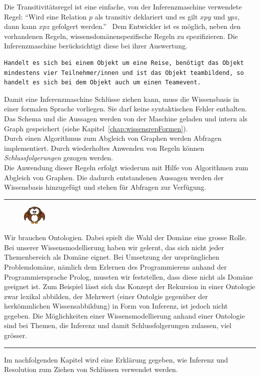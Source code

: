 Die Transitivitätsregel ist eine einfache, von der Inferenzmaschine verwendete Regel: ``Wird eine Relation $p$ als transitiv deklariert und es gilt $x p y$ und $y p z$, dann kann $x p z$ gefolgert werden.''~\cite[Seite 289]{IspekOntoBedeutung}
Dem Entwickler ist es möglich, neben den vorhandenen Regeln, wissensdomänenspezifische Regeln zu spezifizieren. Die Inferenzmaschine berücksichtigt diese bei ihrer Auswertung.

\begin{lstlisting}[caption={Beispiel einer Regel in einer Wissensbasis.}]
Handelt es sich bei einem Objekt um eine Reise, benötigt das Objekt mindestens vier Teilnehmer/innen und ist das Objekt teambildend, so handelt es sich bei dem Objekt auch um einen Teamevent.
\end{lstlisting}

Damit eine Inferenzmaschine Schlüsse ziehen kann, muss die Wissensbasis in einer formalen Sprache vorliegen. Sie darf keine syntaktischen Fehler enthalten. Das Schema und die Aussagen werden von der Maschine geladen und intern als Graph gespeichert (siehe Kapitel~\ref{chap:wissensrepFormen}).\\
Durch einen Algorithmus zum Abgleich von Graphen werden Abfragen implementiert. Durch wiederholtes Anwenden von Regeln können \textit{Schlussfolgerungen} gezogen werden.\\ Die Anwendung dieser Regeln erfolgt wiederum mit Hilfe von Algorithmen zum Abgleich von Graphen. Die dadurch entstandenen Aussagen werden der Wissensbasis hinzugefügt und stehen für Abfragen zur Verfügung.

\noindent\rule[1ex]{\textwidth}{1pt}
\begin{figure}
    \vspace{-14pt}
    \includegraphics[width=0.1\textwidth]{bilder/owl.png}
\end{figure}
Wir brauchen Ontologien. Dabei spielt die Wahl der Domäne eine grosse Rolle. Bei unserer Wissensmodellierung haben wir gelernt, das sich nicht jeder Themenbereich als Domäne eignet.
Bei Umsetzung der ursprünglichen Problemdomäne, nämlich dem Erlernen des Programmierens anhand der Programmiersprache Prolog, mussten wir feststellen, dass diese nicht als Domäne geeignet ist. Zum Beispiel lässt sich das Konzept der Rekursion in einer Ontologie zwar lexikal abbilden, der Mehrwert (einer Ontolgie gegenüber der herkömmlichen Wissensabbildung) in Form von Inferenz, ist jedoch nicht gegeben. Die Möglichkeiten einer Wissensmodellierung anhand einer Ontologie sind bei Themen, die Inferenz und damit Schlussfolgerungen zulassen, viel grösser.
\noindent\rule[1ex]{\textwidth}{1pt}

Im nachfolgenden Kapitel wird eine Erklärung gegeben, wie Inferenz und Resolution zum Ziehen von Schlüssen verwendet werden.
